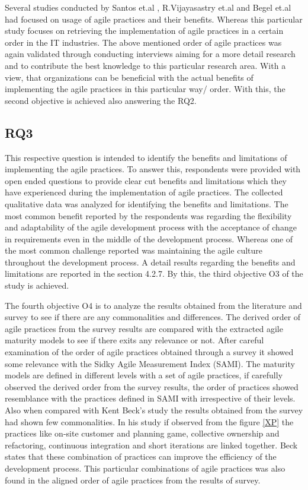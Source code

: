 \documentclass[a4paper,oneside]{bth}
\begin{document}
Several studies conducted by Santos et.al \cite{santos_improving_2013}, R.Vijayasastry et.al \cite{vijayasarathy_agile_2008} and Begel et.al \cite{begel_usage_2007} had focused on usage of agile practices and their benefits. Whereas this particular study focuses on retrieving the implementation of agile practices in a certain order in the IT industries. The above mentioned order of agile practices was again validated through conducting interviews aiming for a more detail research and to contribute the best knowledge to this particular research area. With a view, that organizations can be beneficial with the actual benefits of implementing the agile practices in this particular way/ order. With this, the second objective is achieved also answering the RQ2.
\subsection{RQ3}
This respective question is intended to identify the benefits and limitations of implementing the agile practices. To answer this, respondents were provided with open ended questions to provide clear cut benefits and limitations which they have experienced during the implementation of agile practices. The collected qualitative data was analyzed for identifying the benefits and limitations. The most common benefit reported by the respondents was regarding the flexibility and adaptability of the agile development process with the acceptance of change in requirements even in the middle of the development process. Whereas one of the most common challenge reported was maintaining the agile culture throughout the development process. A detail results regarding the benefits and limitations are reported in the section 4.2.7. By this, the third objective O3 of the study is achieved.

The fourth objective O4 is to analyze the results obtained from the literature and survey to see if there are any commonalities and differences. The derived order of agile practices from the survey results are compared with the extracted agile maturity models to see if there exits any relevance or not. After careful examination of the order of agile practices obtained through a survey it showed some relevance with the Sidky Agile Measurement Index (SAMI). The maturity models are defined in different levels with a set of agile practices, if carefully observed the derived order from the survey results, the order of practices showed resemblance with the practices defined in SAMI with irrespective of their levels. Also when compared with Kent Beck’s study the results obtained from the survey had shown few commonalities. In his study if observed from the figure \ref{XP} the practices like on-site customer and planning game, collective ownership and refactoring, continuous integration and short iterations are linked together. Beck states that these combination of practices can improve the efficiency of the development process. This particular combinations of agile practices  was also found in the aligned order of agile practices from the results of survey.
\end{document}
